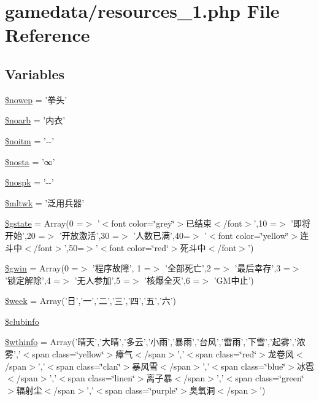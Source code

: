 \hypertarget{resources__1_8php}{\section{gamedata/resources\+\_\+1.php File Reference}
\label{resources__1_8php}
}
\subsection*{Variables}
\begin{DoxyCompactItemize}
\item 
\hyperlink{resources__1_8php_a413d4ee11837afa83d33b1cd34244911}{\$nowep} = '拳头'
\item 
\hyperlink{resources__1_8php_a7042f4c981c7c1dd023648a96ee9a456}{\$noarb} = '内衣'
\item 
\hyperlink{resources__1_8php_ad51c71e4cc6cd78c709454b5f2a2f84c}{\$noitm} = '-\/-\/'
\item 
\hyperlink{resources__1_8php_a1b178dce2c8c7c1f35b20c828d51de4a}{\$nosta} = '∞'
\item 
\hyperlink{resources__1_8php_a472cdfe07d9d5ca35696f2aa6848fd0c}{\$nospk} = '-\/-\/'
\item 
\hyperlink{resources__1_8php_af12f55cfe5805f1081499f04e700478a}{\$mltwk} = '泛用兵器'
\item 
\hyperlink{resources__1_8php_a5aed3a3ce44a1f7125854d31c7f61a6b}{\$gstate} = Array(0 =$>$ '$<$font color=\char`\"{}grey\char`\"{}$>$已结束$<$/font$>$',10 =$>$ '即将开始',20 =$>$ '开放激活',30 =$>$ '人数已满',40=$>$ '$<$font color=\char`\"{}yellow\char`\"{}$>$连斗中$<$/font$>$',50=$>$'$<$font color=\char`\"{}red\char`\"{}$>$死斗中$<$/font$>$')
\item 
\hyperlink{resources__1_8php_a2957a034129d3598a5d35640b8906532}{\$gwin} = Array(0 =$>$ '程序故障', 1 =$>$ '全部死亡',2 =$>$ '最后幸存',3 =$>$ '锁定解除',4 =$>$ '无人参加',5 =$>$ '核爆全灭',6 =$>$ 'G\+M中止')
\item 
\hyperlink{resources__1_8php_ad51e8a8cd3d4faaf3cb8e8b75dea029f}{\$week} = Array('日','一','二','三','四','五','六')
\item 
\hyperlink{resources__1_8php_a8b3df41376c3d0f32c94cad94b494ce0}{\$clubinfo}
\item 
\hyperlink{resources__1_8php_a42c20343a70aaec3fcdbace0179e4eb2}{\$wthinfo} = Array('晴天','大晴','多云','小雨','暴雨','台风','雷雨','下雪','起雾','浓雾','$<$span class=\char`\"{}yellow\char`\"{}$>$瘴气$<$/span$>$','$<$span class=\char`\"{}red\char`\"{}$>$龙卷风$<$/span$>$','$<$span class=\char`\"{}clan\char`\"{}$>$暴风雪$<$/span$>$','$<$span class=\char`\"{}blue\char`\"{}$>$冰雹$<$/span$>$','$<$span class=\char`\"{}linen\char`\"{}$>$离子暴$<$/span$>$','$<$span class=\char`\"{}green\char`\"{}$>$辐射尘$<$/span$>$','$<$span class=\char`\"{}purple\char`\"{}$>$臭氧洞$<$/span$>$')

\end{DoxyCompactItemize}
